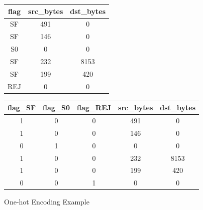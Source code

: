 \begin{figure}[H]
\begin{adjustbox}{width=1.0\textwidth,center}
\begin{tabular}{ccc}
\hline
flag&src\_bytes&dst\_bytes\\
\hline
SF&491&0\\
SF&146&0\\
S0&0&0\\
SF&232&8153\\
SF&199&420\\
REJ&0&0\\
\hline
\end{tabular}
\quad
\longrightarrow
\quad
\begin{tabular}{ccccc}
\hline
flag\_SF&flag\_S0&flag\_REJ&src\_bytes&dst\_bytes\\
\hline
1&0&0&491&0\\
1&0&0&146&0\\
0&1&0&0&0\\
1&0&0&232&8153\\
1&0&0&199&420\\
0&0&1&0&0\\
\hline
\end{tabular}
\end{adjustbox}
\label{ohe}
\caption{One-hot Encoding Example}
\end{figure}

